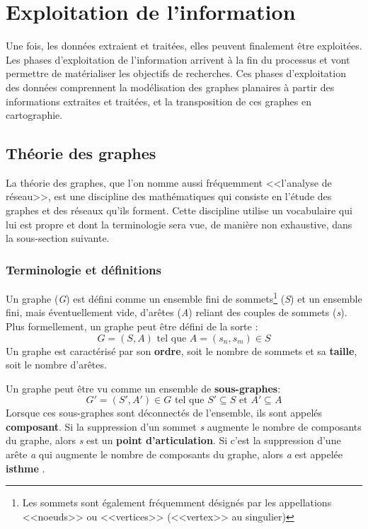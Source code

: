 \section{Exploitation de l'information}
Une fois, les données extraient et traitées, elles peuvent finalement être exploitées.
Les phases d'exploitation de l'information  arrivent à la fin du processus et vont permettre de matérialiser les objectifs de recherches. Ces phases d'exploitation des données comprennent la modélisation des graphes planaires à partir des informations extraites et traitées, et la transposition de ces graphes en cartographie.

\subsection{Théorie des graphes}
La théorie des graphes, que l'on nomme aussi fréquemment <<l'analyse de réseau>>, est une discipline des mathématiques qui consiste en l'étude des graphes et des réseaux qu'ils forment. Cette discipline utilise un vocabulaire qui lui est propre et dont la terminologie sera vue, de manière non exhaustive, dans la sous-section suivante.

\subsubsection{Terminologie et définitions}
Un graphe (\textit{G})  est défini comme un ensemble fini de sommets\footnote{Les sommets sont également fréquemment désignés par les appellations <<noeuds>> ou <<vertices>> (<<vertex>> au singulier) } (\textit{S}) et un ensemble fini, mais éventuellement vide, d'arêtes (\textit{A}) reliant des couples de sommets (\textit{s}). Plus formellement, un graphe peut être défini de la sorte : 
 \[ \boxed{ \; G = (S,A) \text{ tel que }A = (s_{n},s_{m}) \in S \; }\]  
Un graphe est caractérisé par son \textbf{ordre},  soit  le nombre de sommets et sa \textbf{taille}, soit le nombre d'arêtes.

Un graphe peut être vu comme un ensemble de \textbf{sous-graphes}: \[ \boxed{G'=(S',A') \in G \text{ tel que } S'\subseteq S \text{ et } A'\subseteq A} \]  
Lorsque ces sous-graphes sont déconnectés de l'ensemble, ils sont appelés \textbf{composant}. Si la suppression d'un sommet \textit{s} augmente le nombre de composants du graphe, alors \textit{s} est un \textbf{point d'articulation}. Si c'est la suppression d'une arête \textit{a} qui augmente le nombre de composants du graphe, alors \textit{a} est appelée \textbf{isthme} \parencite{beauguitte_graphes_2010,solnon_theorie_nodate}.

